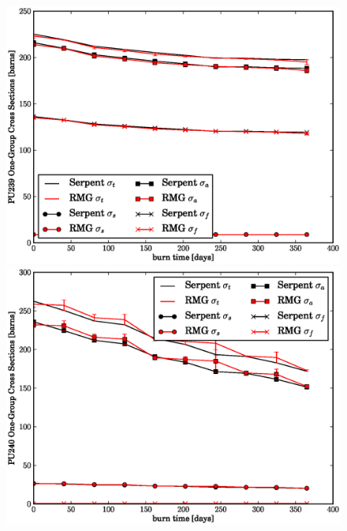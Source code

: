 \begin{figure}[htbp]
\begin{center}
\includegraphics[scale=0.3]{multigroup_method/figs/benchmark/PU239_1g_xs.eps}
\includegraphics[scale=0.3]{multigroup_method/figs/benchmark/PU240_1g_xs.eps}
\end{center}
\end{figure}

